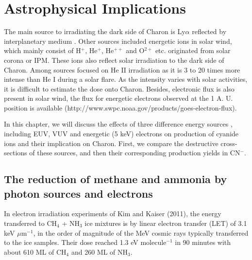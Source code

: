 \chapter{\protect Astrophysical Implications}
\label{astron}

The main source to irradiating the dark side of Charon is Ly$\alpha$ reflected by interplanetary medium \cite{grundy2016formation}. Other sources included energetic ions in solar wind, which mainly consist of H$^+$, He$^+$, He$^{++}$ and O$^{2+}$ etc. originated from solar corona or IPM. These ions also reflect solar irradiation to the dark side of Charon. Among sources focused on He II irradiation as it is 3 to 20 times more intense than He I during a solar flare. As the intensity varies with solar activities, it is difficult to estimate the dose onto Charon. Besides, electronic flux is also present in solar wind, the flux for energetic electrons observed at the 1 A. U. position is available (http://www.swpc.noaa.gov/products/goes-electron-flux). 

In this chapter, we will discuss the effects of three difference energy sources , including EUV, VUV and energetic (5 keV) electrons on production of cyanide ions and their implication on Charon. First, we compare the destructive cross-sections of these sources, and then their corresponding production yields in CN$^-$. 
\section{The reduction of methane and ammonia by photon sources and electrons}

In electron irradiation experiments of Kim and Kaiser (2011)\cite{kim}, the energy transferred to CH$_4$ + NH$_3$ ice mixtures is by linear electron transfer (LET) of 3.1 keV $\mu$m$^{-1}$, in the order of magnitude of the MeV cosmic rays typically transferred to the ice samples. Their dose reached 1.3 eV molecule$^{-1}$ in 90 minutes with about 610 ML of CH$_4$ and 260 ML of NH$_3$. 


